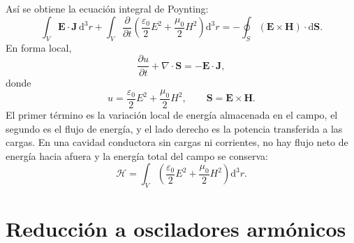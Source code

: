 \documentclass[11pt]{article}
\newcommand{\dd}{\mathrm{d}}
\newcommand{\vb}[1]{\mathbf{#1}}
\begin{document}
As\'i se obtiene la ecuaci\'on integral de Poynting:
\begin{equation}
  \int_V \vb E\cdot\vb J\,\dd^3r
  +
  \int_V
  \frac{\partial}{\partial t}
  \left(
  \frac{\varepsilon_0}{2}E^2
  +
  \frac{\mu_0}{2}H^2
  \right)\dd^3r
  =
  -\oint_S(\vb E\times\vb H)\cdot\dd\vb S.
\end{equation}
En forma local,
\begin{equation}
  \boxed{
  \frac{\partial u}{\partial t}
  +
  \nabla\cdot\vb S
  =
  -\vb E\cdot\vb J,
  }
\end{equation}
donde
\begin{equation}
  u=
  \frac{\varepsilon_0}{2}E^2
  +
  \frac{\mu_0}{2}H^2,
  \qquad
  \vb S=\vb E\times\vb H.
\end{equation}
El primer t\'ermino es la variaci\'on local de energ\'ia almacenada en el
campo, el segundo es el flujo de energ\'ia, y el lado derecho es la potencia
transferida a las cargas. En una cavidad conductora sin cargas ni corrientes,
no hay flujo neto de energ\'ia hacia afuera y la energ\'ia total del campo se
conserva:
\begin{equation}
  \mathcal H
  =
  \int_V
  \left(
  \frac{\varepsilon_0}{2}E^2
  +
  \frac{\mu_0}{2}H^2
  \right)\dd^3r.
\end{equation}

\section{Reducci\'on a osciladores arm\'onicos}
\end{document}
